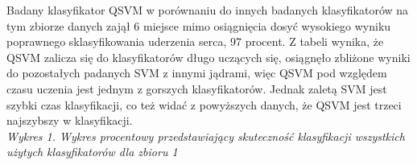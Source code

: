 \documentclass[[10pt,a4paper]{article}
\begin{document}
\begin{enumerate}
Badany klasyfikator QSVM w porównaniu do innych badanych klasyfikatorów na tym zbiorze danych zajął 6 miejsce mimo osiągnięcia dosyć wysokiego wyniku poprawnego sklasyfikowania uderzenia serca, 97 procent. Z tabeli wynika, że QSVM zalicza się do klasyfikatorów długo uczących się, osiągnęło zbliżone wyniki do pozostałych padanych  SVM z innymi jądrami, więc QSVM pod względem czasu uczenia jest jednym z gorszych klasyfikatorów. Jednak zaletą SVM jest szybki czas klasyfikacji, co też widać z powyższych danych, że QSVM jest trzeci najszybszy w klasyfikacji.  \\

 \newline
 \textit{Wykres 1. Wykres procentowy przedstawiający skuteczność klasyfikacji wszystkich użytych klasyfikatorów dla zbioru 1}
\newline


\end{enumerate}
\end{document}
